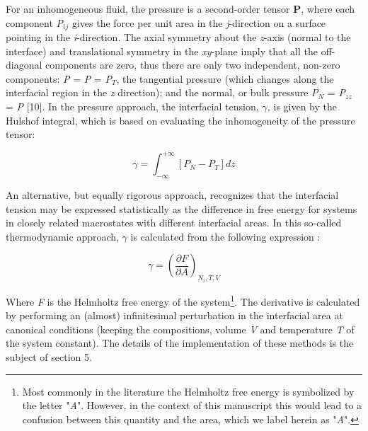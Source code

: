 \documentclass[9pt,bestpractices]{livecoms}
\begin{document}
For an inhomogeneous fluid, the pressure is a second-order tensor \textbf{P},
where each component \textit{P}$_{ij}$ gives the force per unit area in the
\textit{j}-direction on a surface pointing in the \textit{i}-direction. The
axial symmetry about the \textit{z}-axis (normal to the interface) and
translational symmetry in the \textit{xy}-plane imply that all the off-diagonal
components are zero, thus there are only two independent, non-zero components:
\textit{P}\textit{} = \textit{P}\textit{}
= \textit{P}$_{T}$, the tangential pressure (which changes along the
interfacial region in the \textit{z} direction); and the normal, or bulk
pressure \textit{P}$_{N}$ = \textit{P}$_{zz}$ = \textit{P} [10]. In the
pressure approach, the interfacial tension, $\gamma$\textit{,} is given by the
Hulshof integral\citep{hulshof1901}, which
is based on evaluating the inhomogeneity of the pressure tensor:

\begin{equation}
\gamma=\int_{-\infty}^{+\infty}\left[P_{N}-P_{T}\right]dz
\label{eq:hulshof}
\end{equation}

An alternative, but equally rigorous approach, recognizes that the interfacial
tension may be expressed statistically as the difference in free energy for
systems in closely related macrostates with different interfacial areas. In
this so-called thermodynamic approach, $\gamma$ is calculated from the
following expression \citep{gray2011,gloor2005,errington2007}:

\begin{equation}
\gamma=\left(\frac{\partial F}{\partial A}\right)_{N_{i},T,V}
\label{eq:2}
\end{equation}

Where \textit{F} is the Helmholtz free energy of the system\footnote{
Most commonly in the literature the Helmholtz free energy is symbolized by the
letter "\textit{A}". However, in the context of this manuscript this would lead
to a confusion between this quantity and the area, which we label herein as
"\textit{A}".}.  The derivative is calculated by performing an (almost)
infinitesimal perturbation in the interfacial area at canonical conditions
(keeping the compositions, volume \textit{V} and temperature \textit{T} of the
system constant). The details of the implementation of these methods is the
subject of section 5.
\end{document}

